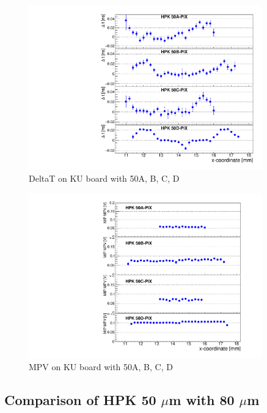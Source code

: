 \documentclass[preprint,1p]{elsarticle}
\begin{document}
\begin{figure}[htbp] 
\centering
\includegraphics[width=0.9\textwidth]{figs/KUBoard_HPK50ABCD/KUBoard_50ABCD_MeanTime.pdf} 
\caption{DeltaT on KU board with 50A, B, C, D } 
\label{fig:Sensors} 
\end{figure} 

\begin{figure}[htbp] 
\centering
\includegraphics[width=0.9\textwidth]{figs/KUBoard_HPK50ABCD/KUBoard_50ABCD_MPV.pdf} 
\caption{MPV on KU board with 50A, B, C, D } 
\label{fig:Sensors} 
\end{figure} 



\subsection{Comparison of HPK 50 $\mu$m with 80 $\mu$m}
\end{document}
